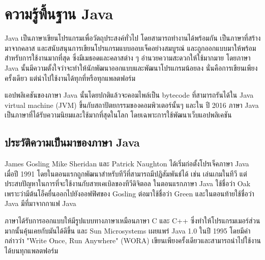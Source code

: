 \newpage

\section{ความรู้พื้นฐาน Java}
Java \cite{java} เป็นภาษาเขียนโปรแกรมเพื่อวัตถุประสงค์ทั่วไป โดยสามารถทำงานได้พร้อมกัน เป็นภาษาที่สร้างมาจากคลาส และสนับสนุนการเขียนโปรแกรมแบบออบเจ็คอย่างสมบูรณ์ และถูกออกแบบมาให้พร้อมสำหรับการใช้งานมากที่สุด ซึ่งมีเมธอดและคลาสต่าง ๆ อำนวยความสะดวกให้ใช้มากมาย โดยภาษา Java นั้นมีความตั้งใจว่าจะทำให้นักพัฒนาออกแบบและพัฒนาโปรแกรมน้อยลง นั่นคือการเขียนเพียงครั้งเดียว แต่นำไปใช้งานได้ทุกที่หรือทุกแพลตฟอร์ม

แอปพลิเคชันของภาษา Java นั้นโดยปกติแล้วจะคอมไพล์เป็น bytecode ที่สามารถรันได้ใน Java virtual machine (JVM) ขึ้นกับสถาปัตยกรรมของคอมพิวเตอร์นั้นๆ และใน ปี 2016 ภาษา Java เป็นภาษาที่ได้รับความนิยมและใช้มากที่สุดในโลก โดยเฉพาะการใช้พัฒนาเว็บแอปพลิเคชัน

	\subsection{ประวัติความเป็นมาของภาษา Java}
	James Gosling Mike Sheridan และ Patrick Naughton ได้เริ่มก่อตั้งโปรเจ็คภาษา Java เมื่อปี 1991 โดยในตอนแรกถูกพัฒนาสำหรับทีวีที่สามารถมีปฎิสัมพันธ์ได้ เช่น เล่นเกมในทีวี แต่ประสบปัญหาในการที่จะใช้งานกับสายเคเบิลของทีวีดิจิตอล ในตอนแรกภาษา Java ใช้ชื่อว่า Oak เพราะว่ามีต้นโอ็คยื่นออกไปยังออฟฟิศของ Gosling ต่อมาใช้ชื่อว่า Green และในตอนท้ายใช้ชื่อว่า Java มีที่มาจากกาแฟ Java 
	
	ภาษาได้รับการออกแบบให้มีรูปแบบทางภาษาเหมือนภาษา C และ C++ ซึ่งทำให้โปรแกรมเมอร์ส่วนมากนั้นคุ้นเคยกับมันได้ดีขึ้น และ Sun Microsystems เผยแพร่ Java 1.0 ในปี 1995 โดยมีคำกล่าวว่า "Write Once, Run Anywhere" (WORA)  เขียนเพียงครั้งเดียวและสามารถนำไปใช้งานได้บนทุกแพลตฟอร์ม


